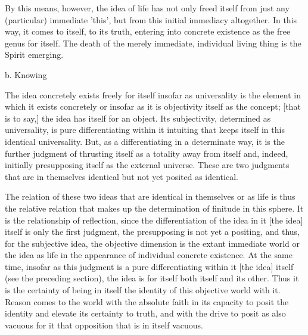 By this means, however, the idea of life
has not only freed itself from just
any (particular) immediate 'this',
but from this initial immediacy altogether.
In this way, it comes to itself, to its truth,
entering into concrete existence
as the free genus for itself.
The death of the merely immediate,
individual living thing is the Spirit emerging.

b. Knowing

The idea concretely exists freely for itself
insofar as universality is the element
in which it exists concretely
or insofar as it is objectivity itself as the concept;
[that is to say,] the idea has itself for an object.
Its subjectivity, determined as universality,
is pure differentiating within it
intuiting that keeps itself in this identical universality.
But, as a differentiating in a determinate way,
it is the further judgment of thrusting itself as
a totality away from itself
and, indeed, initially
presupposing itself as the external universe.
These are two judgments that are in themselves identical
but not yet posited as identical.

The relation of these two ideas
that are identical in themselves
or as life is thus the relative relation
that makes up the determination of finitude in this sphere.
It is the relationship of reflection,
since the differentiation of the idea
in it [the idea] itself is only the first judgment,
the presupposing is not yet a positing,
and thus, for the subjective idea,
the objective dimension is the extant immediate world
or the idea as life in the appearance of individual concrete existence.
At the same time, insofar as this judgment is a pure differentiating
within it [the idea] itself (see the preceding section),
the idea is for itself both itself and its other.
Thus it is the certainty of being in itself
the identity of this objective world with it.
Reason comes to the world with the absolute faith
in its capacity to posit the identity
and elevate its certainty to truth,
and with the drive to posit as
also vacuous for it that opposition
that is in itself vacuous.

